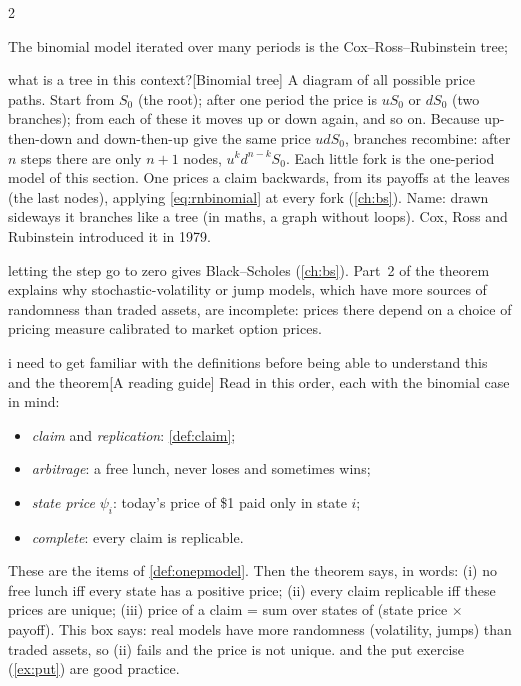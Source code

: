 \begin{paracol}{2}
\begin{finance}
The binomial model iterated over many periods is the Cox--Ross--Rubinstein tree;\begin{answer}{what is a tree in this context?}[Binomial tree]
A diagram of all possible price paths. Start from $S_0$ (the root); after one period the price is $uS_0$
or $dS_0$ (two branches); from each of these it moves up or down again, and so on. Because up-then-down
and down-then-up give the same price $udS_0$, branches recombine: after $n$ steps there are only $n+1$
nodes, $u^kd^{n-k}S_0$. Each little fork is the one-period model of this section. One prices a claim
backwards, from its payoffs at the leaves (the last nodes), applying \eqref{eq:rnbinomial} at every fork
(\cref{ch:bs}). Name: drawn sideways it branches like a tree (in maths, a graph without loops).
Cox, Ross and Rubinstein introduced it in 1979.
\end{answer} letting the step go
to zero gives Black--Scholes (\cref{ch:bs}). Part~2 of the theorem explains why stochastic-volatility
or jump models, which have more sources of randomness than traded assets, are incomplete: prices there
depend on a choice of pricing measure calibrated to market option prices.
\end{finance}\begin{answer}{i need to get familiar with the definitions before being able to understand this and the theorem}[A reading guide]
Read in this order, each with the binomial case in mind:
\begin{itemize}
  \item \emph{claim} and \emph{replication}: \cref{def:claim};
  \item \emph{arbitrage}: a free lunch, never loses and sometimes wins;
  \item \emph{state price} $\psi_i$: today's price of \$1 paid only in state $i$;
  \item \emph{complete}: every claim is replicable.
\end{itemize}
These are the items of \cref{def:onepmodel}. Then the theorem says, in words: (i) no free lunch iff
every state has a positive price; (ii) every claim replicable iff these prices are unique; (iii) price of a
claim = sum over states of (state price $\times$ payoff). This box says: real models have more
randomness (volatility, jumps) than traded assets, so (ii) fails and the price is not unique.
 and the put exercise (\cref{ex:put}) are good practice.
\end{answer}


\end{paracol}

